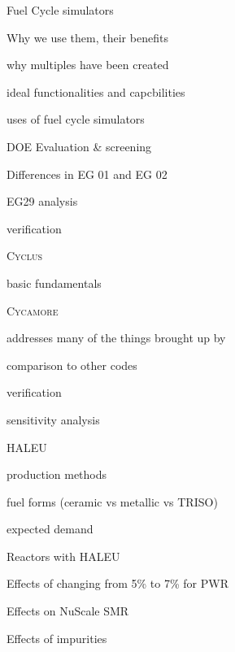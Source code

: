 \documentclass{report}
\newcommand{\Cyclus}{\textsc{Cyclus}\xspace}%
\newcommand{\Cycamore}{\textsc{Cycamore}\xspace}%
\begin{document}
\begin{outline}
\begin{outline}
    \item Fuel Cycle simulators
    \begin{outline}
        \item Why we use them, their benefits
        \item why multiples have been created
        \item ideal functionalities and capcbilities \cite{huff_next_2010,brown_identification_2016}
        \item uses of fuel cycle simulators
        \begin{outline}
            \item \gls{DOE} Evaluation \& screening \cite{wigeland_nuclear_2014}
                \begin{outline}
                      \item Differences in EG 01 and EG 02 
                \end{outline}
            \item EG29 analysis \cite{sunny_transition_2015}
            \item verification \cite{feng_standardized_2016}
        \end{outline}
        \item \Cyclus \cite{huff_fundamental_2016}
        \begin{outline}
              \item basic fundamentals 
              \item \Cycamore \cite{scopatz_cyclus_2015}
              \item addresses many of the things brought up by \cite{huff_next_2010}
              \item comparison to other codes \cite{djokic_application_2015}
              \item verification \cite{bae_standardized_2019}
        \end{outline}
        \item sensitivity analysis
    \end{outline}    
    \item HALEU
    \begin{outline}
        \item production methods
        \item fuel forms (ceramic vs metallic vs TRISO)
        \item expected demand \cite{korsnick_need_2019}
        \item Reactors with HALEU
        \begin{outline}
            \item Effects of changing from 5\% to 7\% for PWR \cite{burns_reactor_2020}
            \item Effects on NuScale SMR \cite{carlson_implications_2022}
            \item Effects of impurities \cite{celikten_effects_2021}
        \end{outline}
    \end{outline}
\end{outline}


\end{outline}
\end{document}
